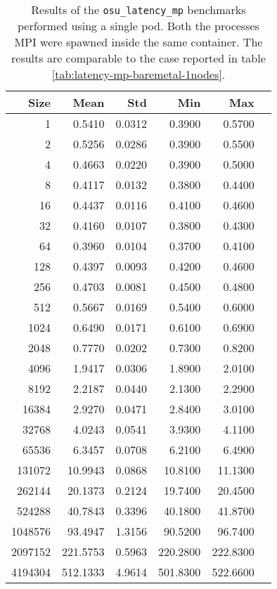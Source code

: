 
\begin{table}
  \centering
  \footnotesize
  \begin{tabular}{rrrrrr}
    \toprule
    \textbf{Size} & \textbf{Mean} & \textbf{Std} & \textbf{Min} & \textbf{Max}	\\
    \midrule
    1 & 0.5410 & 0.0312 & 0.3900 & 0.5700 \\
    2 & 0.5256 & 0.0286 & 0.3900 & 0.5500 \\
    4 & 0.4663 & 0.0220 & 0.3900 & 0.5000 \\
    8 & 0.4117 & 0.0132 & 0.3800 & 0.4400 \\
    16 & 0.4437 & 0.0116 & 0.4100 & 0.4600 \\
    32 & 0.4160 & 0.0107 & 0.3800 & 0.4300 \\
    64 & 0.3960 & 0.0104 & 0.3700 & 0.4100 \\
    128 & 0.4397 & 0.0093 & 0.4200 & 0.4600 \\
    256 & 0.4703 & 0.0081 & 0.4500 & 0.4800 \\
    512 & 0.5667 & 0.0169 & 0.5400 & 0.6000 \\
    1024 & 0.6490 & 0.0171 & 0.6100 & 0.6900 \\
    2048 & 0.7770 & 0.0202 & 0.7300 & 0.8200 \\
    4096 & 1.9417 & 0.0306 & 1.8900 & 2.0100 \\
    8192 & 2.2187 & 0.0440 & 2.1300 & 2.2900 \\
    16384 & 2.9270 & 0.0471 & 2.8400 & 3.0100 \\
    32768 & 4.0243 & 0.0541 & 3.9300 & 4.1100 \\
    65536 & 6.3457 & 0.0708 & 6.2100 & 6.4900 \\
    131072 & 10.9943 & 0.0868 & 10.8100 & 11.1300 \\
    262144 & 20.1373 & 0.2124 & 19.7400 & 20.4500 \\
    524288 & 40.7843 & 0.3396 & 40.1800 & 41.8700 \\
    1048576 & 93.4947 & 1.3156 & 90.5200 & 96.7400 \\
    2097152 & 221.5753 & 0.5963 & 220.2800 & 222.8300 \\
    4194304 & 512.1333 & 4.9614 & 501.8300 & 522.6600 \\
    \bottomrule
  \end{tabular}
  \caption{Results of the \texttt{osu\_latency\_mp} benchmarks performed using a
    single pod. Both the processes MPI were spawned inside the same container.
    The results are comparable to the case reported in table
    \ref{tab:latency-mp-baremetal-1nodes}.}
  \label{tab:latency-mp-one-pod}
\end{table}

